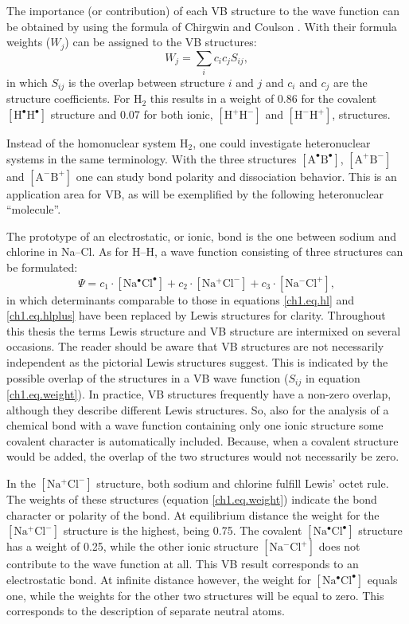 The importance (or contribution) of each VB structure to the wave function can be obtained by using the formula of Chirgwin and Coulson \cite{chirgwin}. With their formula weights ($W_j$) can be assigned to the VB structures:
\begin{equation}
W_{j}=\sum_{i} c_{i}c_{j}S_{ij},
\label{ch1.eq.weight}
\end{equation}
in which $S_{ij}$ is the overlap between structure $i$ and $j$ and $c_i$ and $c_j$ are the structure coefficients. For H$_2$ this results in a weight of 0.86 for the covalent $\mathrm{[H^\bullet H^\bullet]}$ structure and 0.07 for both ionic, $\mathrm{[H^{+} H^{-}]}$ and $\mathrm{[H^{-} H^{+}]}$, structures. 

Instead of the homonuclear system H$_2$, one could investigate heteronuclear systems in the same terminology. With the three structures $\mathrm{[A^\bullet B^\bullet]}$, $\mathrm{[A^{+} B^{-}]}$ and $\mathrm{[A^{-} B^{+}]}$ one can study bond polarity and dissociation behavior. This is an application area for VB, as will be exemplified by the following heteronuclear ``molecule''.

The prototype of an electrostatic, or ionic, bond is the one between sodium and chlorine in \mbox{Na--Cl}. As for H--H, a wave function consisting of three structures can be formulated:
\begin{equation}
\Psi = c_1 \cdot \mathrm{[Na^\bullet Cl^\bullet]} + c_2 \cdot \mathrm{[Na^{+} Cl^{-}]} + c_3 \cdot \mathrm{[Na^{-} Cl^{+}]},
\label{ch1.eq.nacl}
\end{equation}
in which determinants comparable to those in equations \ref{ch1.eq.hl} and \ref{ch1.eq.hlplus} have been replaced by Lewis structures for clarity. Throughout this thesis the terms Lewis structure and VB structure are intermixed on several occasions. The reader should be aware that VB structures are not necessarily independent as the pictorial Lewis structures suggest. This is indicated by the possible overlap of the structures in a VB wave function ($S_{ij}$ in equation \ref{ch1.eq.weight}). In practice, VB structures frequently have a non-zero overlap, although they describe different Lewis structures. So, also for the analysis of a chemical bond with a wave function containing only one ionic structure some covalent character is automatically included. Because, when a covalent structure would be added, the overlap of the two structures would not necessarily be zero.

In the $\mathrm{[Na^{+} Cl^{-}]}$ structure, both sodium and chlorine fulfill Lewis' octet rule. The weights of these structures (equation \ref{ch1.eq.weight}) indicate the bond character or polarity of the bond. At equilibrium distance the weight for the $\mathrm{[Na^{+} Cl^{-}]}$ structure is the highest, being 0.75. The covalent $\mathrm{[Na^\bullet Cl^\bullet]}$ structure has a weight of 0.25, while the other ionic structure $\mathrm{[Na^{-} Cl^{+}]}$ does not contribute to the wave function at all. This VB result corresponds to an electrostatic bond. At infinite distance however, the weight for \mbox{$\mathrm{[Na^\bullet Cl^\bullet]}$} equals one, while the weights for the other two structures will be equal to zero. This corresponds to the description of separate neutral atoms.


